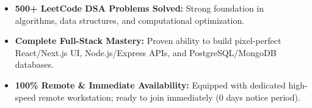 \documentclass[a4paper,10pt]{article}
\begin{document}
\begin{itemize}

    \item \textbf{500+ LeetCode DSA Problems Solved:} Strong foundation in algorithms, data structures, and computational optimization.

    \item \textbf{Complete Full-Stack Mastery:} Proven ability to build pixel-perfect React/Next.js UI, Node.js/Express APIs, and PostgreSQL/MongoDB databases.

    \item \textbf{100\% Remote & Immediate Availability:} Equipped with dedicated high-speed remote workstation; ready to join immediately (0 days notice period).

\end{itemize}

\end{document}
